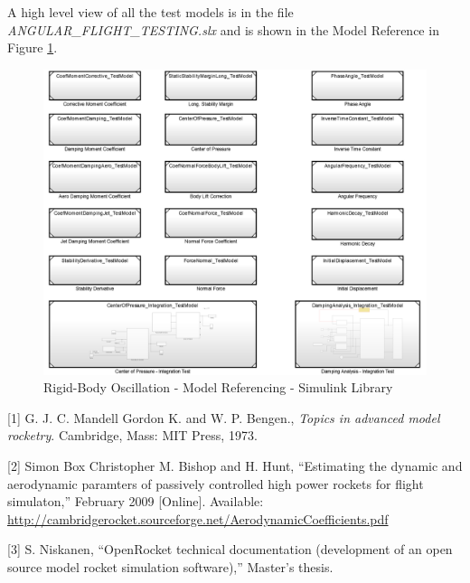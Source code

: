 \documentclass[]{article}
\makeatletter
\newcommand\mainmatter{%
    \cleardoublepage
  \pagenumbering{arabic}}
\newcommand\backmatter{%
  \if@openright
    \cleardoublepage
  \else
    \clearpage
  \fi
   }
\makeatother
\begin{document}
A high level view of all the test models is in the file
\emph{ANGULAR\_FLIGHT\_TESTING.slx} and is shown in the Model Reference
in Figure \ref{angular_model_reference_label}.

\begin{figure}[htbp]
\centering
\includegraphics{images/ANGULAR_FLIGHT_TESTING.png}
\caption{Rigid-Body Oscillation - Model Referencing - Simulink
Library\label{angular_model_reference_label}}
\end{figure}

\clearpage

{[}1{]} G. J. C. Mandell Gordon K. and W. P. Bengen., \emph{Topics in
advanced model rocketry}. Cambridge, Mass: MIT Press, 1973.

{[}2{]} Simon Box Christopher M. Bishop and H. Hunt, ``Estimating the
dynamic and aerodynamic paramters of passively controlled high power
rockets for flight simulaton,'' February 2009 {[}Online{]}. Available:
\url{http://cambridgerocket.sourceforge.net/AerodynamicCoefficients.pdf}

{[}3{]} S. Niskanen, ``OpenRocket technical documentation (development
of an open source model rocket simulation software),'' Master's thesis.

%
%

\mainmatter
\end{document}
